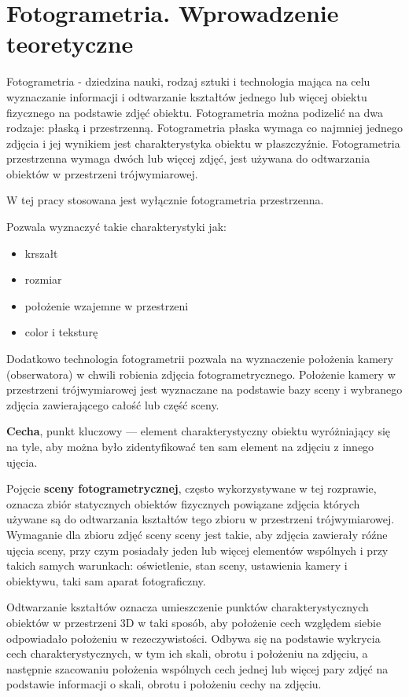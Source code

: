 \graphicspath{ {./img/2_Theory/} }


\chapter{Fotogrametria. Wprowadzenie teoretyczne}

Fotogrametria - dziedzina nauki, rodzaj sztuki i technologia mająca na celu wyznaczanie informacji i odtwarzanie kształtów jednego lub więcej obiektu fizycznego na podstawie zdjęć obiektu.
Fotogrametria można podizelić na dwa rodzaje: płaską i przestrzenną. Fotogrametria płaska wymaga co najmniej jednego zdjęcia i jej wynikiem jest charakterystyka obiektu w płaszczyźnie. Fotogrametria przestrzenna wymaga dwóch lub więcej zdjęć, jest używana do odtwarzania obiektów w przestrzeni trójwymiarowej.

W tej pracy stosowana jest wyłącznie fotogrametria przestrzenna.

Pozwala wyznaczyć takie charakterystyki jak:
\begin{itemize}
   \item krszałt
   \item rozmiar
   \item położenie wzajemne w przestrzeni
   \item color i teksturę
\end{itemize}

Dodatkowo technologia fotogrametrii pozwala na wyznaczenie położenia kamery (obserwatora) w chwili robienia zdjęcia fotogrametrycznego.
Położenie kamery w przestrzeni trójwymiarowej jest wyznaczane na podstawie bazy sceny i wybranego zdjęcia zawierającego całość lub część sceny.

\textbf{Cecha}, punkt kluczowy --- element charakterystyczny obiektu wyróżniający się na tyle, aby można było zidentyfikować ten sam element na zdjęciu z innego ujęcia.

Pojęcie \textbf{sceny fotogrametrycznej}, często wykorzystywane w tej rozprawie, oznacza zbiór statycznych obiektów fizycznych powiązane zdjęcia których używane są do odtwarzania kształtów tego zbioru w przestrzeni trójwymiarowej. Wymaganie dla zbioru zdjęć sceny sceny jest takie, aby zdjęcia zawierały róźne ujęcia sceny, przy czym posiadały jeden lub więcej elementów wspólnych i przy takich samych warunkach: oświetlenie, stan sceny, ustawienia kamery i obiektywu, taki sam aparat fotograficzny.

Odtwarzanie kształtów oznacza umieszczenie punktów charakterystycznych obiektów w przestrzeni 3D w taki sposób, aby położenie cech względem siebie odpowiadało położeniu w rezeczywistości. Odbywa się na podstawie wykrycia cech charakterystycznych, w tym ich skali, obrotu i położeniu na zdjęciu, a następnie szacowaniu położenia wspólnych cech jednej lub więcej pary zdjęć na podstawie informacji o skali, obrotu i położeniu cechy na zdjęciu.

